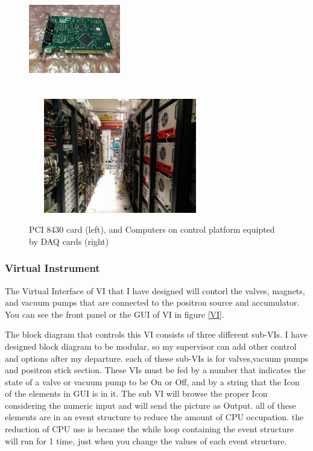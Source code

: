 \documentclass[12pt,a4paper]{article}
\begin{document}
\begin{figure}[h]
\centering
\includegraphics[width=40mm, height=50mm]{PCI_8430}
\includegraphics[width=80mm, height=50mm]{control_platform}
\caption{PCI 8430 card (left), and Computers on control platform equipted by DAQ cards (right) }
\end{figure}
	
\subsubsection{Virtual Instrument}

The Virtual Interface of VI that I have designed will contorl the valves, magnets, and vacuum pumps that are connected to the positron source and accumulator. You can see the front panel or the GUI of VI in figure \ref{VI}. 

The block diagram that controls this VI consists of three different sub-VIs. I have designed  block diagram to be modular, so my supervisor can add other control and options after my departure. each of these sub-VIs is for valves,vacuum pumps and positron stick section. These VIs must be fed by a number that indicates the state of a valve or vacuum pump to be On or Off, and by a string that the Icon of the elements in GUI is in it. The sub VI will browse the proper Icon considering the numeric input and will send the picture as Output. all of these elements are in an event structure to reduce the amount of CPU occupation. the reduction of CPU use is because the while loop containing the event structure will run for 1 time, just when you change the values of each event structure.
\end{document}
